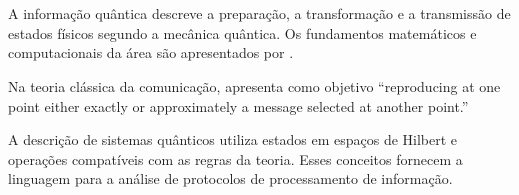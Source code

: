 \chapter{}
\label{cap:introducao}
A informação quântica descreve a preparação, a transformação e a transmissão de estados físicos segundo a mecânica quântica. Os fundamentos matemáticos e computacionais da área são apresentados por \textcite{nielsen2010}.

Na teoria clássica da comunicação, \textcite[p.~379]{shannon1948} apresenta como objetivo \enquote{reproducing at one point either exactly or approximately a message selected at another point.}

A descrição de sistemas quânticos utiliza estados em espaços de Hilbert e operações compatíveis com as regras da teoria. Esses conceitos fornecem a linguagem para a análise de protocolos de processamento de informação.

